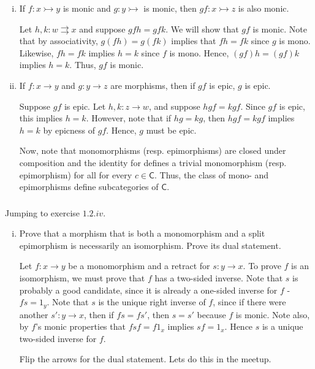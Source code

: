 \documentclass[10pt, oneside]{article}   	%
\newcommand{\cat}[1]{\bm{ \mathsf{#1} }}
\newcommand{\cc}{\cat{C}}
\newcommand{\mono}{\rightarrowtail}
\begin{document}
\begin{enumerate}[(i)]

\item If $f : x \mono y$ is monic and $g : y \mono$ is monic, then $gf : x \mono z$ is also monic.

Let $h,k : w \rightrightarrows x$ and suppose $gfh = gfk$. We will show that $gf$ is monic. Note that by associativity, $g(fh) = g(fk)$ implies that $fh = fk$ since $g$ is mono. Likewise, $fh = fk$ implies $h = k$ since $f$ is mono. Hence, $(gf)h = (gf)k$ implies $h = k$. Thus, $gf$ is monic. 

\item If $f : x \to y$ and $g : y \to z$ are morphisms, then if $gf$ is epic, $g$ is epic. 

Suppose $gf$ is epic. Let $h, k : z \to w$, and suppose $hgf = kgf$. Since $gf$ is epic, this implies $h = k$. However, note that if $hg = kg$, then $hgf = kgf$ implies $h = k$ by epicness of $gf$. Hence, $g$ must be epic.

Now, note that monomorphisms (resp. epimorphisms) are closed under composition and the identity for defines a trivial monomorphism (resp. epimorphism) for all for every $c \in \cc$. Thus, the class of mono- and epimorphisms define subcategories of $\cc$.
\end{enumerate}

\subsubsection{}

Jumping to exercise $1.2.iv$. 

\begin{enumerate}[(i)]

\item Prove that a morphism that is both a monomorphism and a split epimorphism is necessarily an isomorphism. Prove its dual statement. 

Let $f: x \to y$ be a monomorphism and a retract for $s : y \to x$. To prove $f$ is an isomorphism, we must prove that $f$ has a two-sided inverse. Note that $s$ is probably a good candidate, since it is already a one-sided inverse for $f$ - $fs = 1_y$. Note that $s$ is the unique right inverse of $f$, since if there were another $s' : y \to x$, then if $fs = fs'$, then $s = s'$ because $f$ is monic. Note also, by $f$'s monic properties that $fsf = f1_x$ implies $sf = 1_x$. Hence $s$ is a unique two-sided inverse for $f$. 

Flip the arrows for the dual statement. Lets do this in the meetup. 
\end{enumerate}
\end{document}
